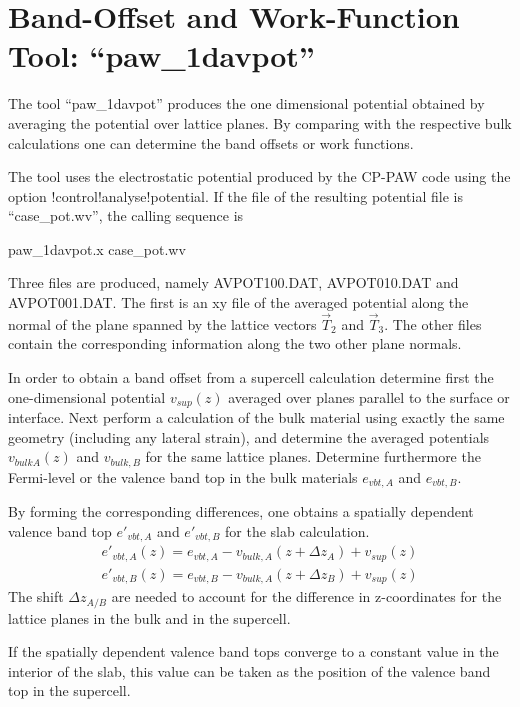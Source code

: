 \documentclass[final,12pt]{article}
\begin{document}
{{{{{{%
\newpage
\section{Band-Offset and Work-Function Tool: ``paw\_1davpot''}
The tool ``paw\_1davpot'' produces the one dimensional potential
obtained by averaging the potential over lattice planes. By comparing
with the respective bulk calculations one can determine the band
offsets or work functions.

The tool uses the electrostatic potential produced by the CP-PAW code
using the option !control!analyse!potential. If the file of the
resulting potential file is ``case\_pot.wv'',  the calling sequence is
\begin{center}
paw\_1davpot.x case\_pot.wv
\end{center}
Three files are produced, namely AVPOT100.DAT, AVPOT010.DAT and
AVPOT001.DAT. The first is an xy file of the averaged potential along
the normal of the plane spanned by the lattice vectors $\vec{T}_2$ and
$\vec{T}_3$. The other files contain the corresponding information
along the two other plane normals.

In order to obtain a band offset from a supercell calculation
determine first the one-dimensional potential $v_{sup}(z)$ averaged
over planes parallel to the surface or interface. Next perform a
calculation of the bulk material using exactly the same geometry
(including any lateral strain), and determine the averaged potentials
$v_{bulk A}(z)$ and $v_{bulk,B}$ for the same lattice planes.
Determine furthermore the Fermi-level or the valence band top in the bulk
materials $e_{vbt,A}$ and $e_{vbt,B}$.

By forming the corresponding differences, one obtains a spatially
dependent valence band top $e'_{vbt,A}$ and $e'_{vbt,B}$ 
for the slab calculation.
\begin{eqnarray*}
e'_{vbt,A}(z)=e_{vbt,A}-v_{bulk,A}(z+\Delta z_A)+v_{sup}(z)
\\
e'_{vbt,B}(z)=e_{vbt,B}-v_{bulk,A}(z+\Delta z_B)+v_{sup}(z)
\end{eqnarray*}
The shift $\Delta z_{A/B}$ are needed to account for the difference in
z-coordinates for the lattice planes in the bulk and in the supercell.

If the spatially dependent valence band tops converge to a constant
value in the interior of the slab, this value can be taken as the
position of the valence band top in the supercell.
 

}}}}}}
\end{document}
